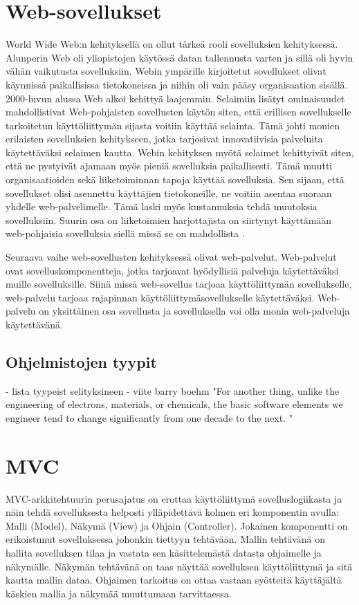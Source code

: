 \documentclass[utf8]{gradu3}
\begin{document}
\chapter{Web-sovellukset}
World Wide Web:n kehityksellä on ollut tärkeä rooli sovelluksien kehityksessä. Alunperin Web oli yliopistojen käytössä datan tallennusta varten ja sillä oli hyvin vähän vaikutusta sovelluksiin. Webin ympärille kirjoitetut sovellukset olivat käynnissä paikallisissa tietokoneissa ja niihin oli vain pääsy organisaation sisällä. 2000-luvun alussa Web alkoi kehittyä laajemmin. Selaimiin lisätyt ominaisuudet mahdollistivat Web-pohjaisten sovellusten käytön siten, että erillisen sovellukselle tarkoitetun käyttöliittymän sijasta voitiin käyttää selainta. Tämä johti monien erilaisten sovelluksien kehitykseen, jotka tarjosivat innovatiivisia palveluita käytettäväksi selaimen kautta. Webin kehityksen myötä selaimet kehittyivät siten, että ne pystyivät ajamaan myös pieniä sovelluksia paikallisesti. Tämä muutti organisaatioiden sekä liiketoiminnan tapoja käyttää sovelluksia. Sen sijaan, että sovellukset olisi asennettu käyttäjien tietokoneille, ne voitiin asentaa suoraan yhdelle web-palvelimelle. Tämä laski myös kustannuksia tehdä muutoksia sovelluksiin. Suurin osa on liiketoimien harjottajista on siirtynyt käyttämään web-pohjaisia sovelluksia siellä missä se on mahdollista \parencite[s.8]{Sommerville}.

Seuraava vaihe web-sovellusten kehityksessä olivat web-palvelut. Web-palvelut ovat sovelluskomponentteja, jotka tarjoavat hyödyllisiä palveluja käytettäväksi muille sovelluksille. Siinä missä web-sovellus tarjoaa käyttöliittymän sovellukselle, web-palvelu tarjoaa rajapinnan käyttöliittymäsovellukselle käytettäväksi. Web-palvelu on yksittäinen osa sovellusta ja sovelluksella voi olla monia web-palveluja käytettävänä. 


\section{Ohjelmistojen tyypit}
- lista tyypeist selityksineen
- viite barry boehm "For another thing, unlike the engineering of electrons, materials, or chemicals, the basic software elements we engineer tend to change significantly from one decade to the next. "

\chapter{MVC}
MVC-arkkitehtuurin perusajatus on erottaa käyttöliittymä sovelluslogiikasta ja
näin tehdä sovelluksesta helposti ylläpidettävä kolmen eri komponentin avulla:
Malli (Model), Näkymä (View) ja Ohjain (Controller). Jokainen komponentti on
erikoistunut sovelluksessa johonkin tiettyyn tehtävään. Mallin tehtävänä on
hallita sovelluksen tilaa ja vastata sen käsittelemästä datasta ohjaimelle ja näkymälle.
Näkymän tehtävänä on taas näyttää sovelluksen käyttöliittymä ja sitä kautta mallin dataa. 
Ohjaimen tarkoitus on ottaa vastaan syötteitä käyttäjältä käskien mallia ja näkymää muuttumaan tarvittaessa.
\end{document}

